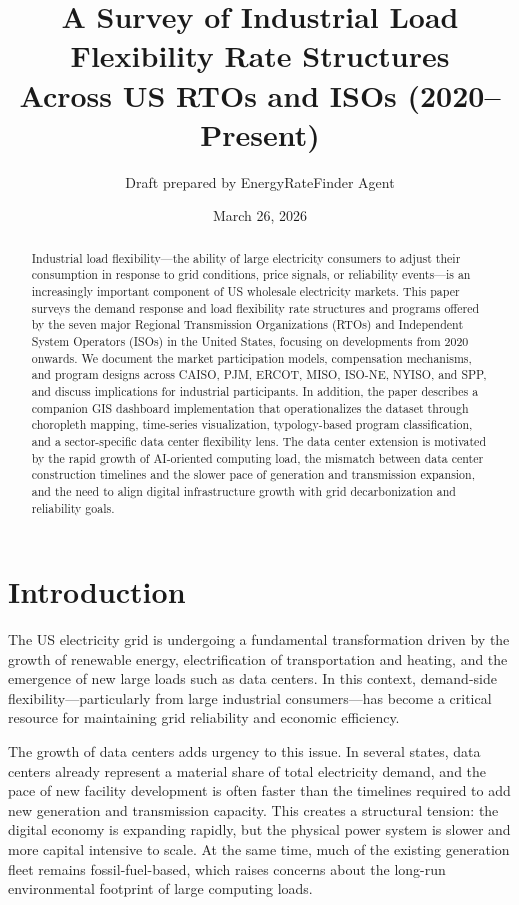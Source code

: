 \documentclass[12pt]{article}
\title{A Survey of Industrial Load Flexibility Rate Structures\\Across US RTOs and ISOs (2020--Present)}
\author{Draft prepared by EnergyRateFinder Agent}
\date{March 26, 2026}
\begin{document}
\maketitle

\begin{abstract}
Industrial load flexibility---the ability of large electricity consumers to adjust their consumption in response to grid conditions, price signals, or reliability events---is an increasingly important component of US wholesale electricity markets. This paper surveys the demand response and load flexibility rate structures and programs offered by the seven major Regional Transmission Organizations (RTOs) and Independent System Operators (ISOs) in the United States, focusing on developments from 2020 onwards. We document the market participation models, compensation mechanisms, and program designs across CAISO, PJM, ERCOT, MISO, ISO-NE, NYISO, and SPP, and discuss implications for industrial participants. In addition, the paper describes a companion GIS dashboard implementation that operationalizes the dataset through choropleth mapping, time-series visualization, typology-based program classification, and a sector-specific data center flexibility lens. The data center extension is motivated by the rapid growth of AI-oriented computing load, the mismatch between data center construction timelines and the slower pace of generation and transmission expansion, and the need to align digital infrastructure growth with grid decarbonization and reliability goals.
\end{abstract}

\section{Introduction}
The US electricity grid is undergoing a fundamental transformation driven by the growth of renewable energy, electrification of transportation and heating, and the emergence of new large loads such as data centers. In this context, demand-side flexibility---particularly from large industrial consumers---has become a critical resource for maintaining grid reliability and economic efficiency.

The growth of data centers adds urgency to this issue. In several states, data centers already represent a material share of total electricity demand, and the pace of new facility development is often faster than the timelines required to add new generation and transmission capacity. This creates a structural tension: the digital economy is expanding rapidly, but the physical power system is slower and more capital intensive to scale. At the same time, much of the existing generation fleet remains fossil-fuel-based, which raises concerns about the long-run environmental footprint of large computing loads.
\end{document}
